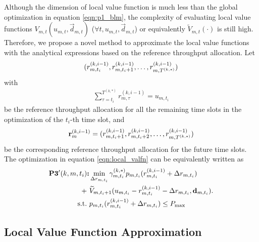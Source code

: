 Although the dimension of local value function is much less than the global optimization in equation \eqref{eqn:p1_blm},
the complexity of evaluating local value functions $V_{m,t}  (u_{m,t}, \vec{d}_{m,t})$ ($\forall t, u_{m,t}, \vec{d}_{m,t}$) or equivalently $\widetilde{V}_{m,t}(\cdot)$ is still high. Therefore, we propose a novel method to approximate the local value functions with the analytical expressions based on the reference throughput allocation. 
Let
$$( r^{(k,i-1)}_{m,t_i}, r^{(k,i-1)}_{m,t_i+1}, \dots, r^{(k,i-1)}_{m,T^{(k,*)}} )$$
with 
\begin{align}
    \sum_{\tau=t_i}^{T^{(k,*)}} r^{(k,i-1)}_{m,\tau} = u_{m,t_i}
    \label{eqn:reference_constraint}
\end{align}
be the reference throughput allocation for all the remaining time slots in the optimization of the $t_i$-th time slot, and
\begin{align*}
    {\mathbf{r}}^{(k,i-1)}_{m} = ( r^{(k,i-1)}_{m,t_i+1}, r^{(k,i-1)}_{m,t_i+2}, \dots, r^{(k,i-1)}_{m,T^{(k,*)}} )
\end{align*}
be the corresponding reference throughput allocation for the future time slots. The optimization in equation \eqref{eqn:local_valfn} can be equivalently written as
\begin{align}
\textbf{P3$'(k,m,t_i)$:}& \min_{ \Delta r_{m,t_i} } \gamma^{(k,*)}_{m,t_i} p_{m,t_i} (r^{(k,i-1)}_{m,t_i}+\Delta r_{m,t_i}) \nonumber\\ 
 +~&\widetilde{V}_{m,t_i+1}(u_{m,t_i}-r^{(k,i-1)}_{m,t_i}-\Delta r_{m,t_i}, \mathbf{d}_{m,t_i}).  \label{eqn:local_valfn_delta}
 \\
 \text{s.t.~}& p_{m,t_i}( r^{(k,i-1)}_{m,t_i} + \Delta{r}_{m,t_i} ) \leq P_{\max}
\end{align}

\subsection{Local Value Function Approximation}
\label{subsec:local_valfn_approx}

